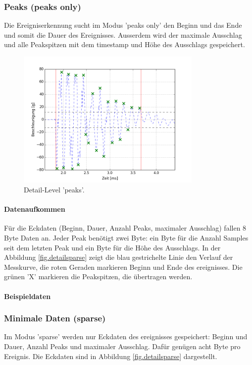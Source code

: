 \subsubsection{Peaks (peaks only)}
Die Ereigniserkennung sucht im Modus 'peaks only' den Beginn und das Ende und somit die Dauer des Ereignisses. Ausserdem wird der maximale Ausschlag und alle Peakspitzen mit dem \gls{timestamp} und Höhe des Ausschlags gespeichert.
\begin{figure}
	\centering
		\includegraphics[width=0.8\textwidth]{images/peaks.png}
	\caption{Detail-Level 'peaks'.}
	\label{fig.detailpeaks}
\end{figure}

\paragraph{Datenaufkommen} Für die Eckdaten (Beginn, Dauer, Anzahl Peaks, maximaler Ausschlag) fallen 8 Byte Daten an. Jeder Peak benötigt zwei Byte: ein Byte für die Anzahl Samples seit dem letzten Peak und ein Byte für die Höhe des Ausschlags. In der Abbildung \ref{fig.detailsparse} zeigt die blau gestrichelte Linie den Verlauf der Messkurve, die roten Geraden markieren Beginn und Ende des \gls{ereignis}ses. Die grünen 'X' markieren die Peakspitzen, die übertragen werden.

\paragraph{Beispieldaten} 

\subsubsection{Minimale Daten (sparse)}
Im Modus 'sparse' werden nur Eckdaten des \gls{ereignis}ses gespeichert: Beginn und Dauer, Anzahl Peaks und maximaler Ausschlag. Dafür genügen acht Byte pro Ereignis. Die Eckdaten sind in Abbildung \ref{fig.detailsparse} dargestellt.

